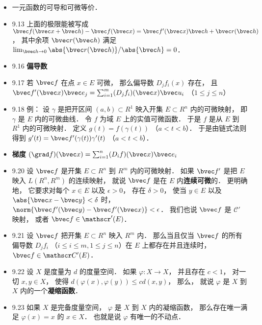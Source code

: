 \begin{itemize}
\item 一元函数的可导和可微等价．

\item 9.13 上面的极限能被写成 $\bvec f(\bvec x+\bvec h) - \bvec f(\bvec x) = \bvec f'(\bvec x)\bvec h + \bvec r(\bvec h)$， 其中余项 $\bvec r(\bvec h)$ 满足 $\lim_{\bvec h\to0} \abs{\bvec r(\bvec h)}/\abs{\bvec h} = 0$．

\item 9.16 \textbf{偏导数}

\item 9.17 若 $\bvec f$ 在点 $x\in E$ 可微， 那么偏导数 $D_jf_i(x)$ 存在， 且 $\bvec f'(\bvec x)\bvec e_j = \sum_{i=1}^m (D_jf_i)(\bvec x)\bvec u_i$ （$1\leqslant j\leqslant n$）

\item 9.18 例： 设 $\gamma$ 是把开区间 $(a,b)\subset R^1$ 映入开集 $E\subset R^n$ 内的可微映射， 即 $\gamma$ 是 $E$ 内的可微曲线． 令 $f$ 为域 $E$ 上的实值可微函数． 于是 $f$ 是从 $E$ 到 $R^1$ 内的可微映射． 定义 $g(t) = f(\gamma(t))$ （$a< t<b$）． 于是由链式法则得到 $g'(t) = \bvec f'(\gamma(t))\gamma'(t)$ （$a<t<b$）．

\item \textbf{梯度} $(\grad f)(\bvec x) = \sum_{i=1}^n (D_i f)(\bvec x)\bvec e_i$

\item 9.20 设 $\bvec f$ 是开集 $E\subset R^n$ 到 $R^m$ 内的可微映射． 如果 $\bvec f'$ 是把 $E$ 映入 $L(R^n,R^m)$ 的连续映射， 就说 $\bvec f$ 是在 $E$ 内\textbf{连续可微}的． 更明确地， 它要求对每个 $x\in E$ 以及 $\epsilon > 0$， 存在 $\delta >0$， 使当 $y\in E$ 以及 $\abs{\bvec x-\bvec y}<\delta$ 时， $\norm{\bvec f'(\bvec y)-\bvec f'(\bvec x)} < \epsilon$． 我们也说 $\bvec f$ 是 $\mathscr C'$ 映射， 或者 $\bvec f\in \mathscr'(E)$．

\item 9.21 设 $\bvec f$ 把开集 $E\subset R^n$ 映入 $R^m$ 内． 那么当且仅当 $\bvec f$ 的所有偏导数 $D_jf_i$ （$i\leqslant i\leqslant m, 1\leqslant j\leqslant n$）在 $E$ 上都存在并且连续时， $\bvec f\in \mathscr C'(E)$．

\item 9.22 设 $X$ 是度量为 $d$ 的度量空间． 如果 $\varphi:X\to X$， 并且存在 $c<1$， 对一切 $x,y\in X$， 使得 $d(\varphi(x),\varphi(y))\leqslant cd(x,y)$， 那么， 就说 $\varphi$ 是 $X$ 到 $X$ 内的一个\textbf{凝缩函数}．

\item 9.23 如果 $X$ 是完备度量空间， $\varphi$ 是 $X$ 到 $X$ 内的凝缩函数， 那么存在唯一满足 $\varphi(x)=x$ 的 $x\in X$． 也就是说 $\varphi$ 有唯一的不动点．


\end{itemize}
